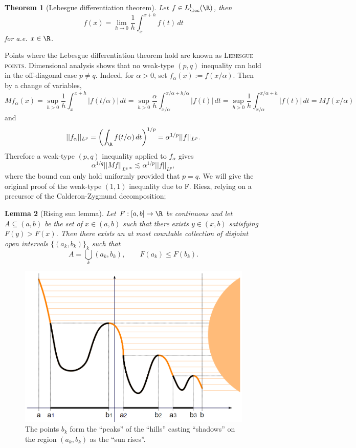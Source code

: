\documentclass[reqno]{amsart}
\newtheorem{theorem}{Theorem}
\newtheorem{lemma}[theorem]{Lemma}
\theoremstyle{definition}
\theoremstyle{remark}
\renewcommand{\emph}{\textsc}
\begin{document}
\begin{theorem}[Lebesgue differentiation theorem]
	Let $f \in L^1_{\loc} (\R)$, then 
		\[ f(x) = \lim_{h \to 0} \frac1h \int_x^{x + h} f(t) \, dt \]
	for a.e. $x \in \R$. 
\end{theorem}
	
Points where the Lebesgue differentiation theorem hold are known as \emph{Lebesgue points}. Dimensional analysis shows that no weak-type $(p, q)$ inequality can hold in the off-diagonal case $p \neq q$. Indeed, for $\alpha > 0$, set $f_\alpha (x) := f(x/\alpha)$. Then by a change of variables, 
	\[ Mf_\alpha (x) = \sup_{h > 0} \frac1h \int_x^{x + h} |f(t/\alpha)| \, dt = \sup_{h > 0} \frac{\alpha}{h}\int_{x/\alpha}^{x/\alpha + h/\alpha} |f(t)| \, dt = \sup_{h > 0} \frac1h \int_{x/\alpha}^{x/\alpha + h} |f(t)| \, dt = Mf (x/\alpha) \]
and
	\[ ||f_\alpha||_{L^p} = \left( \int_\R f(t/\alpha) \, dt \right)^{1/p} = \alpha^{1/p} ||f||_{L^p}. \]
Therefore a weak-type $(p, q)$ inequality applied to $f_\alpha$ gives
	\[ \alpha^{1/q} || Mf ||_{L^{q,\infty}} \lesssim \alpha^{1/p} ||f||_{L^p}, \]
where the bound can only hold uniformly provided that $p = q$. We will give the original proof of the weak-type $(1, 1)$ inequality due to F. Riesz, relying on a precursor of the Calderon-Zygmund decomposition;

\begin{lemma}[Rising sun lemma]
	Let $F : [a,b] \to \R$ be continuous and let $A \subseteq (a, b)$ be the set of $x \in (a, b)$ such that there exists $y \in (x, b)$ satisfying $F(y) >F(x)$. Then there exists an at most countable collection of disjoint open intervals $\{(a_k, b_k)\}_k$ such that 
		\[  A = \bigcup_k (a_k, b_k), \qquad F(a_k) \leq F(b_k). \]	
\end{lemma}

\begin{figure}[h]
	\begin{center}
		\includegraphics[scale = 0.4]{risingsun}
	\end{center}
	\caption{The points $b_k$ form the ``peaks'' of the ``hills'' casting ``shadows'' on the region $(a_k, b_k)$ as the ``sun rises''.}
\end{figure}
\end{document}
